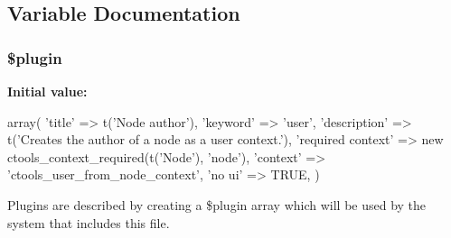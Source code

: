 \subsection{Variable Documentation}
\hypertarget{user__from__node_8inc_ada8a7130088351710bb02ed622d6bf65}{
\subsubsection[{\$plugin}]{\setlength{\rightskip}{0pt plus 5cm}\$plugin}}
\label{user__from__node_8inc_ada8a7130088351710bb02ed622d6bf65}
{\bfseries Initial value:}
\begin{DoxyCode}
 array(
  'title' => t('Node author'),
  'keyword' => 'user',
  'description' => t('Creates the author of a node as a user context.'),
  'required context' => new ctools_context_required(t('Node'), 'node'),
  'context' => 'ctools_user_from_node_context',
  'no ui' => TRUE,
)
\end{DoxyCode}
Plugins are described by creating a \$plugin array which will be used by the system that includes this file. 